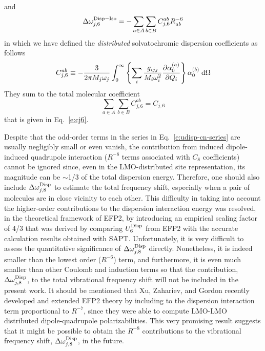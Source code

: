 \documentclass[a4paper,titlepage,twoside,fleqn,12pt]{book}
\begin{document}
\begin{refsection}
%
and 
%
\begin{equation} \label{e:dw-disp-6-iso-approx-distributed}
\Delta \omega_{j,6}^{\rm Disp-Iso} = 
- \sum_{a\in  A}\sum_{b\in B}
C^{ab}_{j,6} R^{-6}_{ab}  
\end{equation}
%
in which we have defined the \emph{distributed} solvatochromic 
dispersion coefficients as follows
%
\begin{equation} \label{e:cj6-distributed}
C^{ab}_{j,6} \equiv -\frac{3}{2\pi M_j\omega_j}
\int_{0}^{\infty} 
\left\{
\sum_i \frac{g_{ijj}}{M_i\omega_i^2} 
\frac{\partial \alpha_0^{(a)}}{\partial Q_i}
\right\}
\alpha_0^{(b)}  \;{\rm d}\Omega  
\end{equation}
%
They sum to the total molecular coefficient
%
\begin{equation}
\sum_{a\in  A}\sum_{b\in B} C^{ab}_{j,6}  =  C_{j,6} 
\end{equation}
%
that is given in Eq.~\eqref{e:cj6}.

Despite that the odd\hyp{}order terms in the series in Eq.~\eqref{e:udisp-cn-series} 
are usually negligibly small or even vanish, the contribution 
from induced dipole\hyp{}induced quadrupole interaction 
($R^{-8}$ terms associated with $C_8$ coefficients) 
cannot be ignored since, even in the LMO\hyp{}distributed 
site representation, its magnitude can be $\sim$1/3 of the total 
dispersion energy.\citep{Adamovic.Gordon.MolPhys.2005} Therefore, one should also include 
$\Delta\omega_{j,8}^{\rm Disp}$ to estimate the total 
frequency shift, especially when a pair of molecules 
are in close vicinity to each other. This difficulty 
in taking into account the higher\hyp{}order contributions 
to the dispersion interaction energy was resolved, in the 
theoretical framework of EFP2, by introducing an empirical 
scaling factor of 4/3 that was derived by comparing 
$U^{\rm Disp}_6$ from EFP2 with the accurate calculation results 
obtained with SAPT.\citep{Jeziorski.Moszynski.Szalewicz.ChemRev.1994,
Adamovic.Gordon.MolPhys.2005} Unfortunately, it is very 
difficult to assess the quantitative significance of 
$\Delta\omega_{j,8}^{\rm Disp}$ directly. Nonetheless, 
it is indeed smaller than the lowest order ($R^{-6}$) term, 
and furthermore, it is even much smaller than other 
Coulomb and induction terms so that the contribution, 
$\Delta\omega_{j,8}^{\rm Disp}$, to the total vibrational 
frequency shift will not be included in the present work. 
It should be mentioned that Xu, Zahariev, and Gordon 
recently developed and extended EFP2 theory by including 
to the dispersion interaction term proportional to $R^{-7}$, 
since they were able to compute LMO\hyp{}LMO distributed 
dipole\hyp{}quadrupole polarizabilities.\citep{Xu.Zahariev.Gordon.JCTC.2014} 
This very promising result suggests that it might be 
possible to obtain the $R^{-8}$ contributions to the 
vibrational frequency shift, $\Delta\omega_{j,8}^{\rm Disp}$, 
in the future.



\end{refsection}
\end{document}
